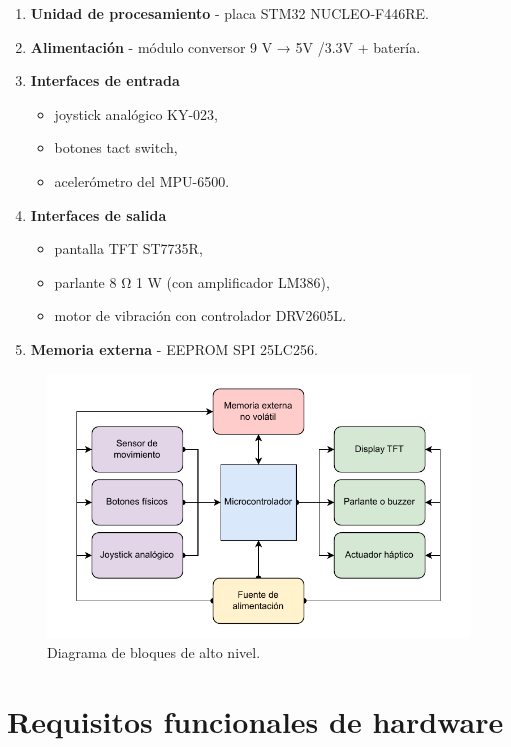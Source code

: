 \documentclass[11pt,a4paper]{article}
\begin{document}
\begin{enumerate}
  \item \textbf{Unidad de procesamiento} - placa STM32 NUCLEO-F446RE.
  \item \textbf{Alimentación} - módulo conversor 9 {\si\volt} → 5{\si\volt} /{3.3}{\si\volt} + batería.
  \item \textbf{Interfaces de entrada}
  \begin{itemize}
    \item joystick analógico KY-023, 
    \item botones tact switch, 
    \item acelerómetro del MPU-6500.
  \end{itemize}
  \item \textbf{Interfaces de salida} 
  \begin{itemize}
    \item pantalla TFT ST7735R, 
    \item parlante 8 Ω 1 W (con amplificador LM386), 
    \item motor de vibración con controlador DRV2605L.
  \end{itemize}
  \item \textbf{Memoria externa} - EEPROM SPI 25LC256.
\end{enumerate}

\begin{figure}[h]
  \centering
  \includegraphics[width=.9\linewidth]{../Figuras/diagrama_bloques_proyecto.pdf}
  \caption{Diagrama de bloques de alto nivel.}
\end{figure}

\section{Requisitos funcionales de hardware}
\end{document}
